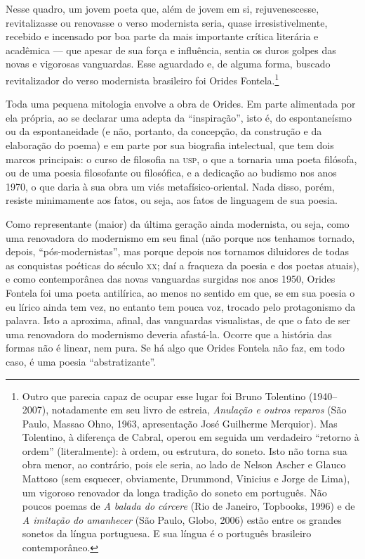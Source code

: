 Nesse quadro, um jovem poeta que, além de jovem em si, rejuvenescesse,
revitalizasse ou renovasse o verso modernista seria, quase irresistivelmente, recebido e incensado por boa parte da mais importante crítica literária e acadêmica --- que apesar de sua força e inﬂuência,
sentia os duros golpes das novas e vigorosas vanguardas. Esse aguardado
e, de alguma forma, buscado revitalizador do verso modernista brasileiro
foi Orides Fontela.\footnote{Outro que parecia capaz de ocupar esse lugar foi Bruno Tolentino
(1940--2007), notadamente em seu livro de estreia, \emph{Anulação e
outros reparos} (São Paulo, Massao Ohno, 1963, apresentação José
Guilherme Merquior). Mas Tolentino, à diferença de Cabral, operou em
seguida um verdadeiro ``retorno à ordem'' (literalmente): à ordem, ou
estrutura, do soneto. Isto não torna sua obra menor, ao contrário, pois
ele seria, ao lado de Nelson Ascher e Glauco Mattoso (sem esquecer,
obviamente, Drummond, Vinicius e Jorge de Lima), um vigoroso renovador
da longa tradição do soneto em português. Não poucos poemas de \emph{A
balada do cárcere} (Rio de Janeiro, Topbooks, 1996) e de \emph{A
imitação do amanhecer} (São Paulo, Globo, 2006) estão entre os grandes
sonetos da língua portuguesa. E sua língua é o português brasileiro
contemporâneo.}

Toda uma pequena mitologia envolve a obra de Orides. Em parte alimentada por ela própria, ao se declarar uma adepta da ``inspiração'',
isto é, do espontaneísmo ou da espontaneidade (e não, portanto, da
concepção, da construção e da elaboração do poema) e em parte por sua
biograﬁa intelectual, que tem dois marcos principais: o curso de
ﬁlosoﬁa na \textsc{usp}, o que a tornaria uma poeta ﬁlósofa, ou de uma poesia
ﬁlosofante ou ﬁlosóﬁca, e a dedicação ao budismo nos anos 1970, o que
daria à sua obra um viés metafísico-oriental. Nada disso, porém, resiste
minimamente aos fatos, ou seja, aos fatos de linguagem de sua poesia.

Como representante (maior) da última geração ainda modernista, ou seja,
como uma renovadora do modernismo em seu ﬁnal (não porque nos tenhamos
tornado, depois, ``pós-modernistas'', mas porque depois nos tornamos
diluidores de todas as conquistas poéticas do século \textsc{xx}; daí a fraqueza da poesia e dos poetas atuais), e como contemporânea das novas
vanguardas surgidas nos anos 1950, Orides Fontela foi uma poeta antilírica, ao menos no sentido em que, se em sua poesia o eu lírico ainda tem
vez, no entanto tem pouca voz, trocado pelo protagonismo da palavra.
Isto a aproxima, aﬁnal, das vanguardas visualistas, de que o fato de ser
uma renovadora do modernismo deveria afastá-la. Ocorre que a história
das formas não é linear, nem pura. Se há algo que Orides Fontela não
faz, em todo caso, é uma poesia ``abstratizante''.


